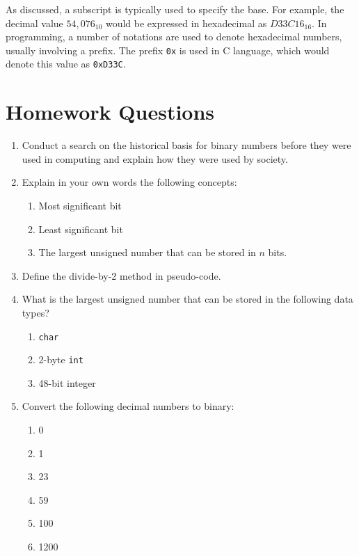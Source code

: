 As discussed, a subscript is typically used to specify the base. For example, the decimal value $54,076_{10}$
would be expressed in hexadecimal as $D33C16_{16}$. In programming, a number of notations are used to denote
hexadecimal numbers, usually involving a prefix. The prefix \texttt{0x} is used in C language, which would 
denote this value as \texttt{0xD33C}.


\vfill\clearpage
\section*{Homework Questions}

\small
\begin{multicols*}{2}
   \begin{enumerate}[label=\thechapter.\arabic*]
    \item Conduct a search on the historical basis for binary numbers before they were used in %
    computing and explain how they were used by society.
    \item Explain in your own words the following concepts:
    \begin{enumerate}
        \item Most significant bit
        \item Least significant bit
        \item The largest unsigned number that can be stored in $n$ bits.
    \end{enumerate}
    \item Define the divide-by-2 method in pseudo-code.
    \item What is the largest unsigned number that can be stored in the following data types?
    \begin{enumerate}
        \item \texttt{char}
        \item 2-byte \texttt{int}
        \item 48-bit integer
    \end{enumerate}
    \item Convert the following decimal numbers to binary:
    \begin{multicols*}{2}
        \begin{enumerate}
            \item 0
            \item 1
            \item 23
            \item 59
            \item 100
            \item 1200

\end{enumerate}
\end{multicols*}
\end{enumerate}
\end{multicols*}
